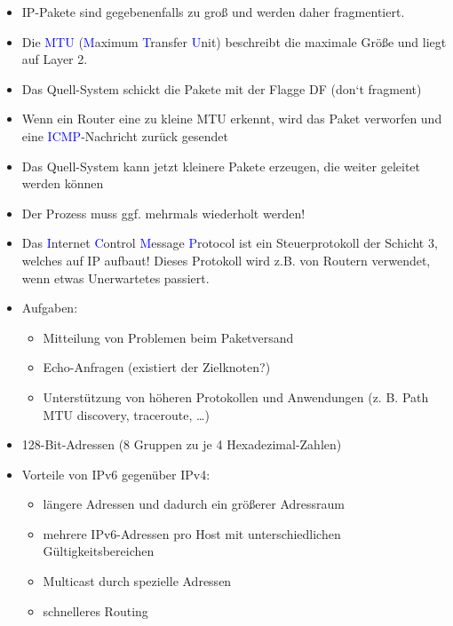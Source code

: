 \begin{itemize}
    \item IP-Pakete sind gegebenenfalls zu groß und werden daher fragmentiert.
    \item Die \textcolor{blue}{MTU} (\textcolor{blue}{M}aximum \textcolor{blue}{T}ransfer \textcolor{blue}{U}nit) beschreibt die maximale Größe und liegt auf Layer 2.
\end{itemize}

\begin{itemize}
    \item Das Quell-System schickt die Pakete mit der Flagge DF (don‘t fragment)
    \item Wenn ein Router eine zu kleine MTU erkennt, wird das Paket verworfen und eine \textcolor{blue}{ICMP}-Nachricht zurück gesendet
    \item Das Quell-System kann jetzt kleinere Pakete erzeugen, die weiter geleitet werden können
    \item Der Prozess muss ggf. mehrmals wiederholt werden!
\end{itemize}

\begin{itemize}
    \item Das \textcolor{blue}{I}nternet \textcolor{blue}{C}ontrol \textcolor{blue}{M}essage \textcolor{blue}{P}rotocol ist ein Steuerprotokoll der Schicht 3, welches auf IP aufbaut! Dieses Protokoll wird z.B. von Routern verwendet, wenn etwas Unerwartetes passiert.
    \item Aufgaben:
    \begin{itemize}
        \item Mitteilung von Problemen beim Paketversand
        \item Echo-Anfragen (existiert der Zielknoten?)
        \item Unterstützung von höheren Protokollen und Anwendungen (z. B. Path MTU discovery, traceroute, \ldots)
    \end{itemize}
\end{itemize}

\begin{itemize}
    \item 128-Bit-Adressen (8 Gruppen zu je 4 Hexadezimal-Zahlen)
    \item Vorteile von IPv6 gegenüber IPv4:
    \begin{itemize}
        \item längere Adressen und dadurch ein größerer Adressraum
        \item mehrere IPv6-Adressen pro Host mit unterschiedlichen Gültigkeitsbereichen
        \item Multicast durch spezielle Adressen
        \item schnelleres Routing
    \end{itemize}
\end{itemize}